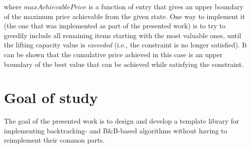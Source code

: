 where $maxAchievablePrice$ is a function of entry that gives an upper boundary of the maximum
price achievable from the given state. One way to implement it (the one that was implemented
as part of the presented work) is to try to greedily include all remaining items starting with
the
most valuable ones, until the lifting capacity value is \emph{exceeded} (i.e., the constraint
is no longer satisfied). It can be shown that the cumulative price achieved in this case is
an upper boundary of the best value that can be achieved while satisfying the constraint.

\section{Goal of study}

The goal of the presented work is to design and develop a template library for implementing
backtracking- and B\&B-based algorithms without having to reimplement their common parts.





